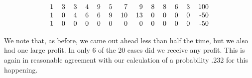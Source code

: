 \begin{example}
\begin{table}
$$\begin{tabular}{rrrrrrrrrrrrr}
1   &3   &3   &4  & 9  & 5  & 7   &9   &8   &8   &6   &3   & 100\\ 
1   &0   &4   &6  & 6  & 9  &10   &13  &0   &0   &0   &0   & -50\\ 
1   &0   &0   &0  & 0  & 0  & 0   &0   &0   &0   &0   &0   & -50\\ 
\end{tabular}
$$
\caption{Simulation of chain letter (Poisson case).}
\label{table 10.5}
\end{table}
\par
We note that, as before, we came out ahead less than half the time, but we also
had one large profit.  In only 6 of the 20 cases did we receive any profit. 
This is again in reasonable agreement with our calculation of a probability
.232 for this happening.
\end{example}

